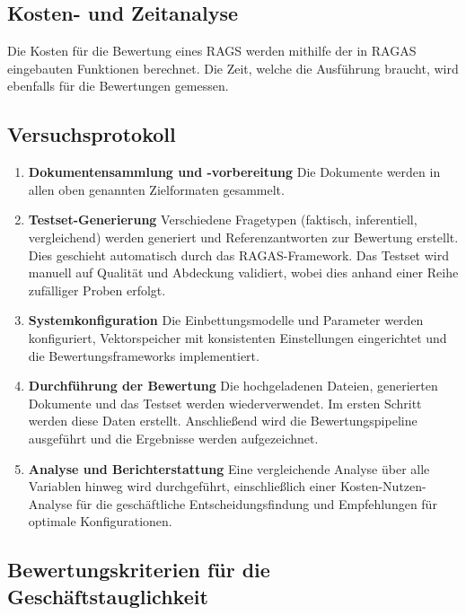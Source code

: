 \subsection{Kosten- und Zeitanalyse}
Die Kosten für die Bewertung eines RAGS werden mithilfe der in RAGAS eingebauten Funktionen berechnet. Die Zeit, welche die Ausführung braucht, wird ebenfalls für die Bewertungen gemessen.

\subsection{Versuchsprotokoll}

\begin{enumerate}
    \item \textbf{Dokumentensammlung und -vorbereitung}
    Die Dokumente werden in allen oben genannten Zielformaten gesammelt.

    \item \textbf{Testset-Generierung}
    Verschiedene Fragetypen (faktisch, inferentiell, vergleichend) werden generiert und Referenzantworten zur Bewertung erstellt.
    Dies geschieht automatisch durch das RAGAS-Framework.
    Das Testset wird manuell auf Qualität und Abdeckung validiert, wobei dies anhand einer Reihe zufälliger Proben erfolgt.

    \item \textbf{Systemkonfiguration}
    Die Einbettungsmodelle und Parameter werden konfiguriert, Vektorspeicher mit konsistenten Einstellungen eingerichtet und die Bewertungsframeworks implementiert.

    \item \textbf{Durchführung der Bewertung}
    Die hochgeladenen Dateien, generierten Dokumente und das Testset werden wiederverwendet. Im ersten Schritt werden diese Daten erstellt.
    Anschließend wird die Bewertungspipeline ausgeführt und die Ergebnisse werden aufgezeichnet.

    \item \textbf{Analyse und Berichterstattung}
    Eine vergleichende Analyse über alle Variablen hinweg wird durchgeführt, einschließlich einer Kosten-Nutzen-Analyse für die geschäftliche Entscheidungsfindung und Empfehlungen für optimale Konfigurationen.
\end{enumerate}

\subsection{Bewertungskriterien für die Geschäftstauglichkeit}

